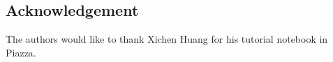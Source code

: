\documentclass{article}
\begin{document}
\subsection*{Acknowledgement}
\label{sec:acknowledgement}

The authors would like to thank Xichen Huang for his tutorial notebook in Piazza.

\vfill\pagebreak


%

\end{document}
